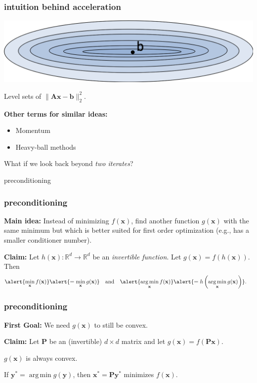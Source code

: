 \documentclass[compress]{beamer}
\newcommand{\bv}[1]{\mathbf{#1}}
\newcommand{\R}{\mathbb{R}}
\DeclareMathOperator*{\argmin}{arg\,min}
\begin{document}
\begin{frame}[t]
	\frametitle{intuition behind acceleration}
	\begin{center}
		\includegraphics[width=\textwidth]{poor_conditioning.png}
		
		Level sets of $\|\bv{A}\bv{x} - \bv{b}\|_2^2$.
	\end{center}
	
	\textbf{Other terms for similar ideas:}
	\begin{itemize}
		\item Momentum
		\item Heavy-ball methods
	\end{itemize}
	
	\begin{center}
		\alert{What if we look back beyond \emph{two iterates}?}
	\end{center}
\end{frame}

\begin{frame}[standout]
	\begin{center}
		\large preconditioning
	\end{center}
\end{frame}

\begin{frame}
	\frametitle{preconditioning}
	\textbf{Main idea:}
	Instead of minimizing $f(\bv{x})$, find another function $g(\bv{x})$ with the same minimum but which is better suited for first order optimization (e.g., has a smaller conditioner number).
	
	\vspace{2em}
	\textbf{Claim:} Let $h(\bv{x}): \R^d \rightarrow \R^d$ be an \emph{invertible function}. Let $g(\bv{x}) = f(h(\bv{x}))$. Then
	\begin{align*}
		\alert{\min_{\bv{x}} f(\bv{x})} &\alert{= \min_{\bv{x}} g(\bv{x})} & &\text{and} & \alert{\argmin_{\bv{x}} f(\bv{x})} &\alert{= h\left(\argmin_{\bv{x}} g(\bv{x})\right)}.
	\end{align*}
\end{frame}

\begin{frame}[t]
	\frametitle{preconditioning}
	\textbf{First Goal:} We need $g(\bv{x})$ to still be convex.
	
	\textbf{Claim:} Let $\bv{P}$ be an (invertible) $d\times d$ matrix and let $g(\bv{x}) = f(\bv{P}\bv{x})$. 
	\begin{center} 
		\alert{$g(\bv{x})$ is always convex.}
	\end{center}

\vspace{10em}
If $\bv{y}^* = \argmin g(\bv{y})$, then $\bv{x}^* = \bv{P}\bv{y}^*$ minimizes $f(\bv{x})$. 
\end{frame}
\end{document}
